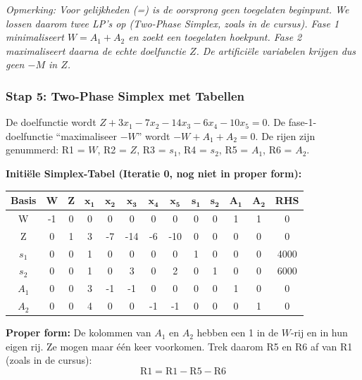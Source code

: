 \documentclass[a4paper,11pt]{article}
\begin{document}
\begin{oefenblok}
    \textit{Opmerking: Voor gelijkheden (=) is de oorsprong geen toegelaten beginpunt. We lossen daarom twee LP's op (Two-Phase Simplex, zoals in de cursus). Fase 1 minimaliseert $W = A_1 + A_2$ en zoekt een toegelaten hoekpunt. Fase 2 maximaliseert daarna de echte doelfunctie $Z$. De artificiële variabelen krijgen dus geen $-M$ in $Z$.}

    \subsubsection*{Stap 5: Two-Phase Simplex met Tabellen}

    De doelfunctie wordt $Z + 3x_1 - 7x_2 - 14x_3 - 6x_4 - 10x_5 = 0$. De fase-1-doelfunctie ``maximaliseer $-W$'' wordt $-W + A_1 + A_2 = 0$. De rijen zijn genummerd: R1 = $W$, R2 = $Z$, R3 = $s_1$, R4 = $s_2$, R5 = $A_1$, R6 = $A_2$.


    \textbf{Initiële Simplex-Tabel (Iteratie 0, nog niet in proper form):}

    \begin{center}
        \footnotesize
        \setlength{\tabcolsep}{3pt}
        \begin{tabular}{|c|c|c|c|c|c|c|c|c|c|c|c|c|}
            \hline
            \textbf{Basis} & \textbf{W} & \textbf{Z} & $\mathbf{x_1}$ & $\mathbf{x_2}$ & $\mathbf{x_3}$ & $\mathbf{x_4}$ & $\mathbf{x_5}$ & $\mathbf{s_1}$ & $\mathbf{s_2}$ & $\mathbf{A_1}$ & $\mathbf{A_2}$ & \textbf{RHS} \\
            \hline
            W & -1 & 0 & 0 & 0 & 0 & 0 & 0 & 0 & 0 & 1 & 1 & 0 \\
            \hline
            Z & 0 & 1 & 3 & -7 & -14 & -6 & -10 & 0 & 0 & 0 & 0 & 0 \\
            \hline
            $s_1$ & 0 & 0 & 1 & 0 & 0 & 0 & 0 & 1 & 0 & 0 & 0 & 4000 \\
            \hline
            $s_2$ & 0 & 0 & 1 & 0 & 3 & 0 & 2 & 0 & 1 & 0 & 0 & 6000 \\
            \hline
            $A_1$ & 0 & 0 & 3 & -1 & -1 & 0 & 0 & 0 & 0 & 1 & 0 & 0 \\
            \hline
            $A_2$ & 0 & 0 & 4 & 0 & 0 & -1 & -1 & 0 & 0 & 0 & 1 & 0 \\
            \hline
        \end{tabular}
    \end{center}

    \textbf{Proper form:} De kolommen van $A_1$ en $A_2$ hebben een 1 in de $W$-rij en in hun eigen rij. Ze mogen maar één keer voorkomen. Trek daarom R5 en R6 af van R1 (zoals in de cursus):
    \[
        \text{R1} = \text{R1} - \text{R5} - \text{R6}
    \]



\end{oefenblok}
\end{document}
